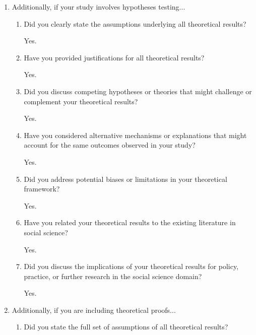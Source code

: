 \documentclass[letterpaper]{article} %
\newcommand{\answerTODO}[1]{#1}
\begin{document}
\begin{enumerate}
\begin{enumerate}
  \item Have you read the ethics review guidelines and ensured that your paper conforms to them?
    
    \answerTODO{Yes.}
\end{enumerate}

\item Additionally, if your study involves hypotheses testing...
\begin{enumerate}
  \item Did you clearly state the assumptions underlying all theoretical results?
    
    \answerTODO{Yes.}

  \item Have you provided justifications for all theoretical results?
    
    \answerTODO{Yes.}

  \item Did you discuss competing hypotheses or theories that might challenge or complement your theoretical results?
    
    \answerTODO{Yes.}

  \item Have you considered alternative mechanisms or explanations that might account for the same outcomes observed in your study?
    
    \answerTODO{Yes.}

  \item Did you address potential biases or limitations in your theoretical framework?
    
    \answerTODO{Yes.}

  \item Have you related your theoretical results to the existing literature in social science?
    
    \answerTODO{Yes.}

  \item Did you discuss the implications of your theoretical results for policy, practice, or further research in the social science domain?
    
    \answerTODO{Yes.}
\end{enumerate}

\item Additionally, if you are including theoretical proofs...
\begin{enumerate}
  \item Did you state the full set of assumptions of all theoretical results?
    

\end{enumerate}
\end{enumerate}
\end{document}
